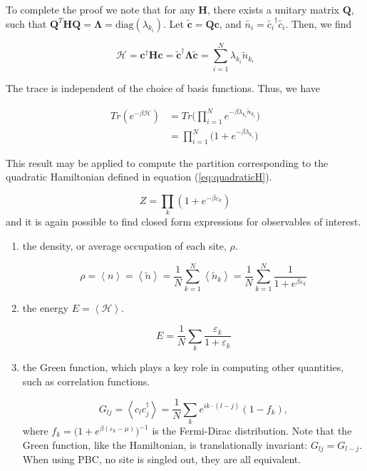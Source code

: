 \documentclass[10pt, twocolumn, twoside]{article}
\begin{document}
To complete the proof we note that for any $\bm H$, there exists a unitary matrix $\bm Q$, such that $\bm Q^T \bm H \bm Q = \bm \Lambda = \text{diag}(\lambda_{k_i})$. Let $\tilde{\bm c} = \bm Q \bm c$, and $\tilde{n_i} = \tilde{c_i}^\dagger \tilde{c_i}$. Then, we find

\begin{equation}
\mathcal{H} = \bm c^\dagger \bm H \bm c = \bm \tilde{\bm c}^\dagger \bm \Lambda \tilde{\bm c} = \sum_{i=1}^N \lambda_{k_i} \tilde{n}_{k_i}
\end{equation}

The trace is independent of the choice of basis functions. Thus, we have

\begin{equation}
\begin{split}
Tr ( e^{-\beta \mathcal{H} } ) &= Tr \bigg( \prod_{i=1}^N e^{-\beta \lambda_{k_i} \tilde{n}_{k_i} } \bigg) \\
&= \prod_{i=1}^N \bigg( 1 + e^{-\beta \lambda_{k_i} } \bigg)
\end{split}
\end{equation}

This result may be applied to compute the partition corresponding to the quadratic Hamiltonian defined in equation (\ref{eq:quadraticH}).

\begin{equation}
Z = \prod_k ( 1 + e^{-\beta \varepsilon_k} )
\end{equation}
and it is again possible to find closed form expressions for observables of interest.

\begin{enumerate}
\item the density, or average occupation of each site, $\rho$.

\begin{equation}
\rho = \left\langle n \right\rangle = \left\langle \tilde{n} \right\rangle = \frac{1}{N} \sum_{k=1}^N \left\langle \tilde{n}_k \right\rangle  = \frac{1}{N} \sum_{k=1}^N  \frac{1}{1 + e^{\beta\varepsilon_k}}
\end{equation}

\item the energy $E = \left\langle \mathcal{H} \right\rangle$.

\begin{equation}
E = \frac{1}{N} \sum_k \frac{\varepsilon_k}{1 + \varepsilon_k}
\end{equation}

\item the Green function, which plays a key role in computing other quantities, such as correlation functions.

\begin{equation}
G_{lj} = \left\langle c_l c_j^\dagger \right\rangle = \frac{1}{N} \sum_k e^{ i k \cdot ( l - j ) } ( 1 - f_k ),
\end{equation}
where $f_k = \big(1 + e^{\beta(\varepsilon_k - \mu)} \big)^{-1}$ is the Fermi-Dirac distribution. Note that the Green function, like the Hamiltonian, is translationally invariant: $G_{lj} = G_{l-j}$. When using PBC, no site is singled out, they are all equivalent.
\end{enumerate}
\end{document}

